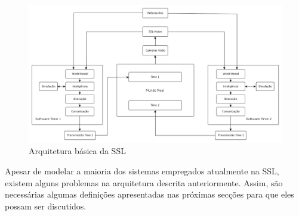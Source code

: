 \begin{landscape}
  \begin{figure}[thpb]
    \centering
    \includegraphics[width=20cm]{imgs/arquitetura_ssl}
    \caption{Arquitetura básica da SSL}
    \label{arquitetura_ssl}
  \end{figure}
\end{landscape}

Apesar de modelar a maioria dos sistemas empregados atualmente na
SSL, existem alguns problemas na arquitetura descrita anteriormente. Assim,
são necessárias algumas definições apresentadas nas próximas secções para que eles possam ser discutidos.
